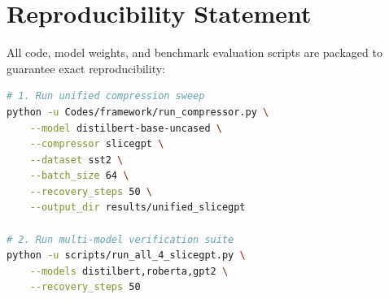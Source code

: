 \section{Reproducibility Statement}
All code, model weights, and benchmark evaluation scripts are packaged to guarantee exact reproducibility:
\begin{lstlisting}[language=bash]
# 1. Run unified compression sweep
python -u Codes/framework/run_compressor.py \
    --model distilbert-base-uncased \
    --compressor slicegpt \
    --dataset sst2 \
    --batch_size 64 \
    --recovery_steps 50 \
    --output_dir results/unified_slicegpt

# 2. Run multi-model verification suite
python -u scripts/run_all_4_slicegpt.py \
    --models distilbert,roberta,gpt2 \
    --recovery_steps 50
\end{lstlisting}
